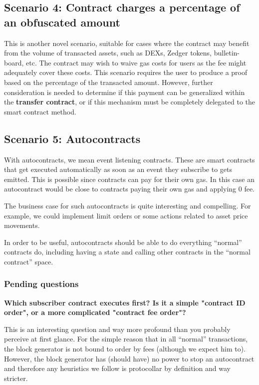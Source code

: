 \documentclass[twocolumn, nofootinbib]{revtex4-2} %
\newcommand{\emphathize}[1]{\textbf{#1}\xspace}
\newcommand{\transfercontract}{\emphathize{transfer contract}}
\begin{document}
    \subsection{Scenario 4: Contract charges a percentage of an obfuscated amount}\label{sec:specifications:scenario-4}
    This is another novel scenario, suitable for cases where the contract may
    benefit from the volume of transacted assets, such as DEXs, Zedger tokens,
    bulletin-board, etc.
    The contract may wish to waive gas costs for users as the fee might
    adequately cover these costs.
    This scenario requires the user to produce a proof based on the percentage
    of the transacted amount.
    However, further consideration is needed to determine if this payment can
    be generalized within the \transfercontract, or if this mechanism must be
    completely delegated to the smart contract method.

    \subsection{Scenario 5: Autocontracts}\label{sec:specifications:scenario-5}

    With autocontracts, we mean event listening contracts.
    These are smart contracts that get executed automatically as soon as an
    event they subscribe to gets emitted.
    This is possible since contracts can pay for their own gas.
    In this case an autocontract would be close to contracts paying their own
    gas and applying 0 fee.

    The business case for such autocontracts is quite interesting and
    compelling.
    For example, we could implement limit orders or some actions related to
    asset price movements.

    In order to be useful, autocontracts should be able to do everything
    ``normal'' contracts do, including having a state and calling other
    contracts in the ``normal contract'' space.

    \subsubsection{Pending questions}\label{sec:specifications:scenario-5:pending-questions}
    \textbf{Which subscriber contract executes first? Is it a simple "contract
            ID order", or a more complicated "contract fee order"?}

    This is an interesting question and way more profound than you probably
    perceive at first glance.
    For the simple reason that in all ``normal'' transactions, the block
    generator is not bound to order by fees (although we expect him to).
    However, the block generator has (should have) no power to stop an
    autocontract and therefore any heuristics we follow is protocollar by
    definition and way stricter.
\end{document}
